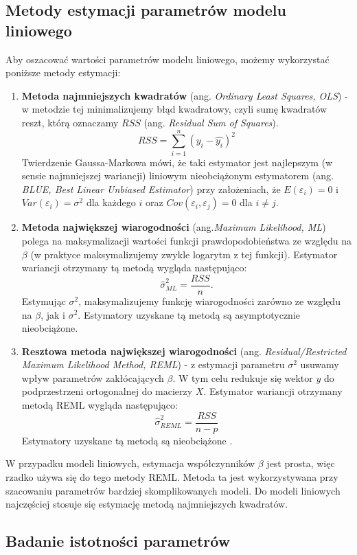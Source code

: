 \documentclass[12pt]{mwbk}
\theoremstyle{plain}
\theoremstyle{definition}
\theoremstyle{definition}
\begin{document}
\subsection{Metody estymacji parametrów modelu liniowego}
Aby oszacować wartości parametrów modelu liniowego, możemy wykorzystać poniższe metody estymacji:
\begin{enumerate}
	\item \textbf{Metoda najmniejszych kwadratów} (ang. \emph{Ordinary Least Squares, OLS}) - w metodzie tej minimalizujemy błąd kwadratowy, czyli sumę kwadratów reszt, którą oznaczamy $RSS$ (ang. \emph{Residual Sum of Squares}).
	$$RSS= \sum_{i=1}^{n}(y_i-\hat{y_i})^2$$
	Twierdzenie Gaussa-Markowa mówi, że taki estymator jest najlepszym (w sensie najmniejszej wariancji) liniowym nieobciążonym estymatorem (ang. \textit{BLUE, Best Linear Unbiased Estimator}) przy założeniach, że $E(\varepsilon_i)=0$ i $Var(\varepsilon_i)=\sigma^2$ dla każdego $i$ oraz $Cov(\varepsilon_i, \varepsilon_j)=0$ dla $i \neq j$.

	\item \textbf{Metoda największej wiarogodności} (ang.\textit{Maximum Likelihood, ML}) polega na maksymalizacji wartości funkcji prawdopodobieństwa ze względu na $\beta$ (w praktyce maksymalizujemy zwykle logarytm z tej funkcji). Estymator wariancji otrzymany tą metodą wygląda następująco:
	$$\hat{\sigma}^{2}_{ML}=\frac{RSS}{n}.$$
	Estymując $\sigma^2$, maksymalizujemy funkcję wiarogodności zarówno ze względu na $\beta$, jak i $\sigma^2$.
	Estymatory uzyskane tą metodą są asymptotycznie nieobciążone.
	
	\item \textbf{Resztowa metoda największej wiarogodności} (ang. \textit{Residual/Restricted Maximum Likelihood Method, REML}) - z estymacji parametru $\sigma^2$ usuwamy wpływ parametrów zakłócających $\beta$. W tym celu redukuje się wektor $y$ do podprzestrzeni ortogonalnej do macierzy $X$. Estymator wariancji otrzymany metodą REML wygląda następująco:
	$$\hat{\sigma}^2_{REML}=\frac{RSS}{n-p}$$
	Estymatory uzyskane tą metodą są nieobciążone \cite{biecek}.
\end{enumerate}

W przypadku modeli liniowych, estymacja współczynników $\beta$ jest prosta, więc rzadko używa się do tego metody REML. Metoda ta jest wykorzystywana przy szacowaniu parametrów bardziej skomplikowanych modeli. Do modeli liniowych najczęściej stosuje się estymację metodą najmniejszych kwadratów.

\subsection{Badanie istotności parametrów}
\end{document}
